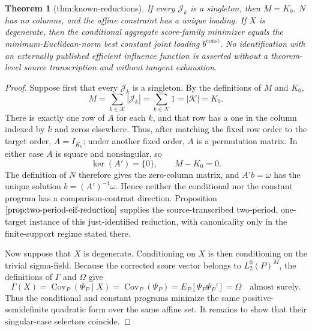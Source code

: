 \documentclass{article}
\newtheorem{theorem}{Theorem}
\begin{document}
\begin{theorem}[thm:known-reductions]\label{thm:known-reductions}
If every \(\mathcal J_k\) is a singleton, then \(M=K_0\), \(N\) has no columns, and the affine constraint has a unique loading.  If \(X\) is degenerate, then the conditional aggregate score-family minimizer equals the minimum-Euclidean-norm best constant joint loading \(b^{\mathrm{const}}\).  No identification with an externally published efficient influence function is asserted without a theorem-level source transcription and without tangent exhaustion.
\end{theorem}
\begin{proof}
Suppose first that every \(\mathcal J_k\) is a singleton.  By the definitions of \(M\) and \(K_0\),
\[
M=\sum_{k\in\mathcal K}|\mathcal J_k|
=\sum_{k\in\mathcal K}1
=|\mathcal K|=K_0.
\tag{K1}
\]
There is exactly one row of \(A\) for each \(k\), and that row has a one in the column indexed by \(k\) and zeros elsewhere.  Thus, after matching the fixed row order to the target order, \(A=I_{K_0}\); under another fixed order, \(A\) is a permutation matrix.  In either case \(A\) is square and nonsingular, so
\[
\ker(A')=\{0\},\qquad M-K_0=0.
\tag{K2}
\]
The definition of \(N\) therefore gives the zero-column matrix, and \(A'b=\omega\) has the unique solution \(b=(A')^{-1}\omega\).  Hence neither the conditional nor the constant program has a comparison-contrast direction.  Proposition \(\ref{prop:two-period-eif-reduction}\) supplies the source-transcribed two-period, one-target instance of this just-identified reduction, with canonicality only in the finite-support regime stated there.

Now suppose that \(X\) is degenerate.  Conditioning on \(X\) is then conditioning on the trivial sigma-field.  Because the corrected score vector belongs to \(L_2^0(P)^M\), the definitions of \(\Gamma\) and \(\Omega\) give
\[
\Gamma(X)
=\operatorname{Cov}_P(\Psi_P\mid X)
=\operatorname{Cov}_P(\Psi_P)
=E_P[\Psi_P\Psi_P']
=\Omega
\quad\text{almost surely}.
\tag{K3}
\]
Thus the conditional and constant programs minimize the same positive-semidefinite quadratic form over the same affine set.  It remains to show that their singular-case selectors coincide.


\end{proof}
\end{document}
